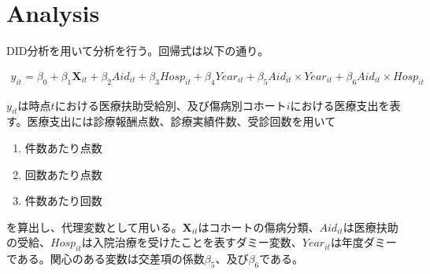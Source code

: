 \documentclass{jsarticle}
\begin{document}
\large

\section{Analysis}

DID分析を用いて分析を行う。回帰式は以下の通り。

 \begin{align*}
 y_{it} = \beta_0 + \beta_1 \mathbf{X}_{it} + \beta_2 \textit{Aid}_{it} + \beta_3 \textit{Hosp}_{it} +
 \beta_4 \textit{Year}_{it} + \beta_5 \textit{Aid}_{it} \times \textit{Year}_{it} + \beta_6 \textit{Aid}_{it} \times \textit{Hosp}_{it} 
 \end{align*}

$y_{it}$は時点$t$における医療扶助受給別、及び傷病別コホート$i$における医療支出を表す。医療支出には診療報酬点数、診療実績件数、受診回数を用いて

 \begin{enumerate}
 
 \item 件数あたり点数
 
 \item 回数あたり点数
 
 \item 件数あたり回数
 
 \end{enumerate}

を算出し、代理変数として用いる。$\mathbf{X}_{it}$はコホートの傷病分類、$\textit{Aid}_{it}$は医療扶助の受給、$\textit{Hosp}_{it}$は入院治療を受けたことを表すダミー変数、$\textit{Year}_{it}$は年度ダミーである。関心のある変数は交差項の係数$\beta_5$、及び$\beta_6$である。
\end{document}
